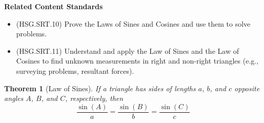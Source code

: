 \documentclass[
]{book}
\providecommand{\tightlist}{%
  \setlength{\itemsep}{0pt}\setlength{\parskip}{0pt}}
\newenvironment{standards}{}{}
\newtheorem{theorem}{Theorem}[chapter]
\theoremstyle{definition}
\theoremstyle{definition}
\theoremstyle{definition}
\theoremstyle{definition}
\theoremstyle{remark}
\begin{document}
\begin{standards}

\begin{center}
\textbf{Related Content Standards}

\end{center}

\begin{itemize}
\tightlist
\item
  (HSG.SRT.10) Prove the Laws of Sines and Cosines and use them to solve problems.
\item
  (HSG.SRT.11) Understand and apply the Law of Sines and the Law of Cosines to find unknown measurements in right and non-right triangles (e.g., surveying problems, resultant forces).
\end{itemize}

\end{standards}

\begin{theorem}[Law of Sines]
If a triangle has sides of lengths \(a\), \(b\), and \(c\) opposite angles \(A\), \(B\), and \(C\), respectively, then
\[\frac{\sin(A)}{a}=\frac{\sin(B)}{b} = \frac{\sin(C)}{c}\]
\end{theorem}
\end{document}

